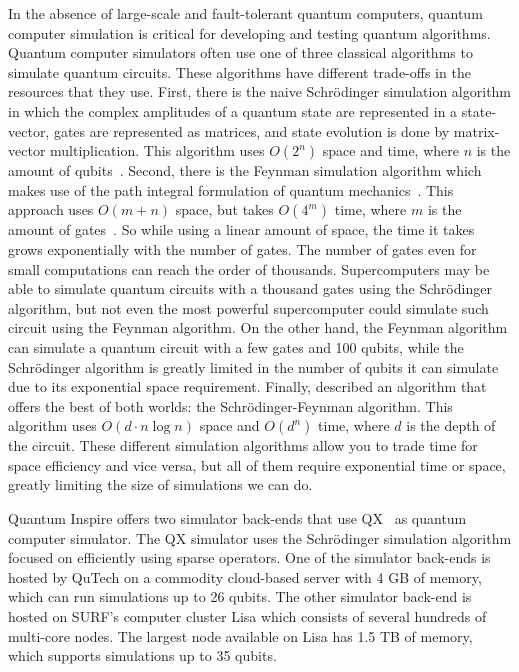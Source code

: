 In the absence of large-scale and fault-tolerant quantum computers, quantum computer simulation is critical for developing and testing quantum algorithms.
Quantum computer simulators often use one of three classical algorithms to simulate quantum circuits.
These algorithms have different trade-offs in the resources that they use.
First, there is the naive Schr{\"o}dinger simulation algorithm in which the complex amplitudes of a quantum state are represented in a state-vector, gates are represented as matrices, and state evolution is done by matrix-vector multiplication.
This algorithm uses $O(2^n)$ space and time, where $n$ is the amount of qubits~\cite{aaronson2016complexity}.
Second, there is the Feynman simulation algorithm which makes use of the path integral formulation of quantum mechanics~\cite{feynman2005space}.
This approach uses $O(m+n)$ space, but takes $O(4^m)$ time, where $m$ is the amount of gates~\cite{aaronson2016complexity}.
So while using a linear amount of space, the time it takes grows exponentially with the number of gates.
The number of gates even for small computations can reach the order of thousands.
Supercomputers may be able to simulate quantum circuits with a thousand gates using the Schr{\"o}dinger  algorithm, but not even the most powerful supercomputer could simulate such circuit using the Feynman algorithm.
On the other hand, the Feynman algorithm can simulate a quantum circuit with a few gates and 100 qubits, while the Schr{\"o}dinger algorithm is greatly limited in the number of qubits it can simulate due to its exponential space requirement.
Finally, \textcite{aaronson2016complexity} described an algorithm that offers the best of both worlds: the Schr{\"o}dinger-Feynman algorithm.
This algorithm uses $O(d \cdot n \log n)$ space and $O(d^n)$ time, where $d$ is the depth of the circuit.
These different simulation algorithms allow you to trade time for space efficiency and vice versa, but all of them require exponential time or space, greatly limiting the size of simulations we can do.

Quantum Inspire offers two simulator back-ends that use QX~\cite{khammassi2017qx} as quantum computer simulator.
The QX simulator uses the Schr{\"o}dinger simulation algorithm focused on efficiently using sparse operators.
One of the simulator back-ends is hosted by QuTech on a commodity cloud-based server with 4 GB of memory, which can run simulations up to 26 qubits.
The other simulator back-end is hosted on SURF's computer cluster Lisa which consists of several hundreds of multi-core nodes.
The largest node available on Lisa has 1.5 TB of memory, which supports simulations up to 35 qubits.

